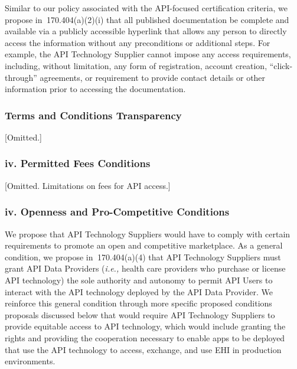 \documentclass[twoside,11pt]{article}
\begin{document}
          Similar to our policy associated with the API-focused certification criteria, we propose in \textsection{} 170.404(a)(2)(i) that all published documentation be complete and available via a publicly accessible hyperlink that allows any person to directly access the information without any preconditions or additional steps. For example, the API Technology Supplier cannot impose any access requirements, including, without limitation, any form of registration, account creation, “click-through” agreements, or requirement to provide contact details or other information prior to accessing the documentation.


          \subsubsection{Terms and Conditions Transparency}

[Omitted.]

          \subsubsection{iv. Permitted Fees Conditions}

[Omitted. Limitations on fees for API access.]

          \subsubsection{iv. Openness and Pro-Competitive Conditions}


          We propose that API Technology Suppliers would have to comply with certain requirements to promote an open and competitive marketplace. As a general condition, we propose in \textsection{} 170.404(a)(4) that API Technology Suppliers must grant API Data Providers (\emph{i.e.,} health care providers who purchase or license API technology) the sole authority and autonomy to permit API Users to interact with the API technology deployed by the API Data Provider. We reinforce this general condition through more specific proposed conditions proposals discussed below that would require API Technology Suppliers to provide equitable access to API technology, which would include granting the rights and providing the cooperation necessary to enable apps to be deployed that use the API technology to access, exchange, and use EHI in production environments.
\end{document}
